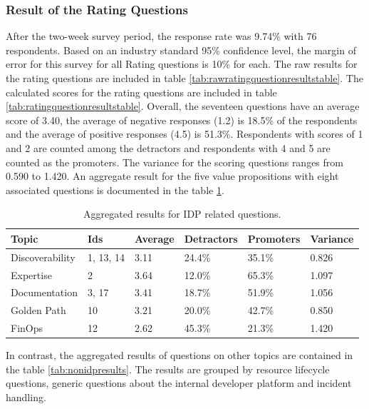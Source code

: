 \documentclass[a4paper,12pt]{article}
\begin{document}
    \subsubsection{Result of the Rating Questions}
    \label{sssec:rratque}
    After the two-week survey period, the response rate was 9.74\% with 76 respondents.
    Based on an industry standard 95\% confidence level\parencite{nistmean}, the margin of error for this survey for all
    Rating questions is 10\% for each.
    The raw results for the rating questions are included in table \ref{tab:rawratingquestionresultstable}.
    The calculated scores for the rating questions are included in table \ref{tab:ratingquestionresultstable}.
    Overall, the seventeen questions have an average score of 3.40, the average of negative responses (1.2) is 18.5\% of the
    respondents and the average of positive responses (4.5) is 51.3\%.
    Respondents with scores of 1 and 2 are counted among the detractors and respondents with 4 and 5 are counted as the promoters.
    The variance for the scoring questions ranges from 0.590 to 1.420.
    An aggregate result for the five value propositions with eight associated questions is documented in the table \ref{tab:aggregateidpresults}.
    \begin{table}[!htbp]
        \begin{center}
            \begin{tabularx}{\textwidth}{llllll}
                \toprule
                Topic           & Ids       & Average & Detractors & Promoters & Variance \\
                \midrule
                Discoverability & 1, 13, 14 & 3.11    & 24.4\%     & 35.1\%    & 0.826    \\
                Expertise       & 2         & 3.64    & 12.0\%     & 65.3\%    & 1.097    \\
                Documentation   & 3, 17     & 3.41    & 18.7\%     & 51.9\%    & 1.056    \\
                Golden Path     & 10        & 3.21    & 20.0\%     & 42.7\%    & 0.850    \\
                FinOps          & 12        & 2.62    & 45.3\%     & 21.3\%    & 1.420    \\
                \bottomrule
            \end{tabularx}
        \end{center}
        \caption{\label{tab:aggregateidpresults} Aggregated results for IDP related questions.}
    \end{table}
    In contrast, the aggregated results of questions on other topics are contained in the table \ref{tab:nonidpresults}.
    The results are grouped by resource lifecycle questions, generic questions about the internal developer platform
    and incident handling.
\end{document}
